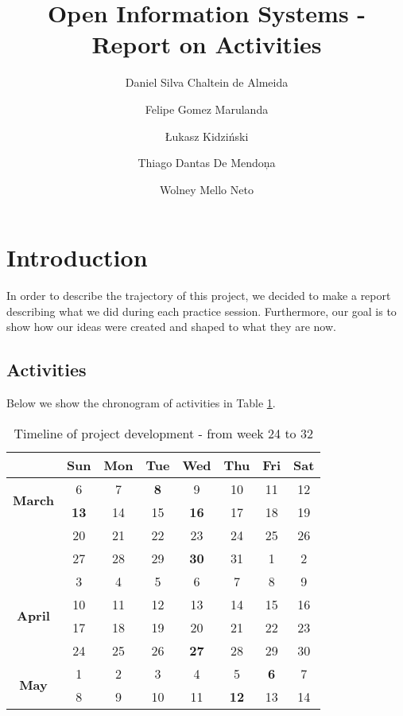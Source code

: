 \documentclass[a4paper,10pt]{article}
\title{Open Information Systems - Report on Activities}
\author{Daniel Silva Chaltein de Almeida
\and Felipe Gomez Marulanda
\and \L{}ukasz Kidzi\'nski
\and Thiago Dantas De Mendon\c{}a
\and Wolney Mello Neto}
\begin{document}
\maketitle

\section{Introduction}
In order to describe the trajectory of this project, we decided to make a report describing what we did during each practice session. Furthermore, our goal is to show how our ideas were created and shaped to what they are now.

\subsection{Activities}
Below we show the chronogram of activities in Table \ref{tab:timeline}.

\begin{table}[!h]
  \centering
  \caption{Timeline of project development - from week 24 to 32}
  \begin{tabular}{|c|c|c|c|c|c|c|c|}
    \hline
    & \textbf{Sun} & \textbf{Mon} & \textbf{Tue} & \textbf{Wed} & \textbf{Thu} & \textbf{Fri} & \textbf{Sat} \\ \hline
    \multirow{2}{*}{\textbf{March}}
    & 6 & 7 & {\large\textbf{8}} & 9 & 10 & 11 & 12 \\ \cline{2-8}
    & {\large\textbf{13}} & 14 & 15 & {\large\textbf{16}} & 17 & 18 & 19 \\ \cline{2-8}
    & 20 & 21 & 22 & 23 & 24 & 25 & 26 \\ \cline{2-8}
    & 27 & 28 & 29 & {\large\textbf{30}} & 31 & 1 & 2 \\ \hline
    \multirow{4}{*}{\textbf{April}}
    & 3 & 4 & 5 & 6 & 7 & 8 & 9  \\ \cline{2-8}
    & 10 & 11 & 12 & 13 & 14 & 15 & 16 \\ \cline{2-8}
    & 17 & 18 & 19 & 20 & 21 & 22 & 23 \\ \cline{2-8}
    & 24 & 25 & 26 & {\large\textbf{27}} & 28 & 29 & 30 \\ \hline
    \multirow{2}{*}{\textbf{May}}
    & 1 & 2 & 3 & 4 & 5 & {\large\textbf{6}} & 7 \\ \cline{2-8}
    & 8 & 9 & 10 & 11 & {\large\textbf{12}} & 13 & 14 \\ \hline
  \end{tabular}
  \label{tab:timeline}
\end{table}
\end{document}
